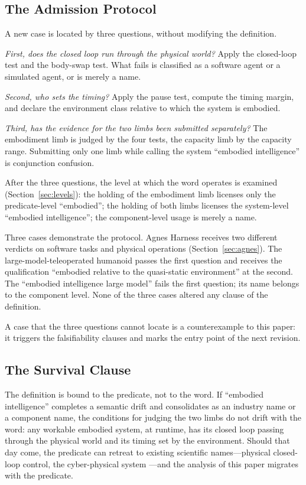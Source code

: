 \documentclass[10pt]{article}
\begin{document}
\subsection{The Admission Protocol}\label{sec:admission}

A new case is located by three questions, without modifying the definition.

\textit{First, does the closed loop run through the physical world?} Apply the closed-loop test and the body-swap test. What fails is classified as a software agent or a simulated agent, or is merely a name.

\textit{Second, who sets the timing?} Apply the pause test, compute the timing margin, and declare the environment class relative to which the system is embodied.

\textit{Third, has the evidence for the two limbs been submitted separately?} The embodiment limb is judged by the four tests, the capacity limb by the capacity range. Submitting only one limb while calling the system ``embodied intelligence'' is conjunction confusion.

After the three questions, the level at which the word operates is examined (Section~\ref{sec:levels}): the holding of the embodiment limb licenses only the predicate-level ``embodied''; the holding of both limbs licenses the system-level ``embodied intelligence''; the component-level usage is merely a name.

Three cases demonstrate the protocol. Agnes Harness receives two different verdicts on software tasks and physical operations (Section~\ref{sec:agnes}). The large-model-teleoperated humanoid passes the first question and receives the qualification ``embodied relative to the quasi-static environment'' at the second. The ``embodied intelligence large model'' fails the first question; its name belongs to the component level. None of the three cases altered any clause of the definition.

A case that the three questions cannot locate is a counterexample to this paper: it triggers the falsifiability clauses and marks the entry point of the next revision.

\subsection{The Survival Clause}\label{sec:survival}

The definition is bound to the predicate, not to the word. If ``embodied intelligence'' completes a semantic drift and consolidates as an industry name or a component name, the conditions for judging the two limbs do not drift with the word: any workable embodied system, at runtime, has its closed loop passing through the physical world and its timing set by the environment. Should that day come, the predicate can retreat to existing scientific names---physical closed-loop control, the cyber-physical system \cite{lee2008}---and the analysis of this paper migrates with the predicate.
\end{document}
